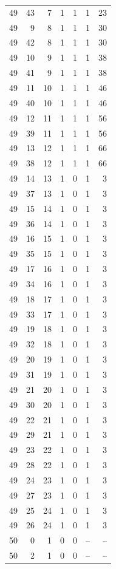 \begin{longtable}{rrrrrrr}
49 & 43 & 7 & 1 & 1 & 1 & 23\\
49 & 9 & 8 & 1 & 1 & 1 & 30\\
49 & 42 & 8 & 1 & 1 & 1 & 30\\
49 & 10 & 9 & 1 & 1 & 1 & 38\\
49 & 41 & 9 & 1 & 1 & 1 & 38\\
49 & 11 & 10 & 1 & 1 & 1 & 46\\
49 & 40 & 10 & 1 & 1 & 1 & 46\\
49 & 12 & 11 & 1 & 1 & 1 & 56\\
49 & 39 & 11 & 1 & 1 & 1 & 56\\
49 & 13 & 12 & 1 & 1 & 1 & 66\\
49 & 38 & 12 & 1 & 1 & 1 & 66\\
49 & 14 & 13 & 1 & 0 & 1 & 3\\
49 & 37 & 13 & 1 & 0 & 1 & 3\\
49 & 15 & 14 & 1 & 0 & 1 & 3\\
49 & 36 & 14 & 1 & 0 & 1 & 3\\
49 & 16 & 15 & 1 & 0 & 1 & 3\\
49 & 35 & 15 & 1 & 0 & 1 & 3\\
49 & 17 & 16 & 1 & 0 & 1 & 3\\
49 & 34 & 16 & 1 & 0 & 1 & 3\\
49 & 18 & 17 & 1 & 0 & 1 & 3\\
49 & 33 & 17 & 1 & 0 & 1 & 3\\
49 & 19 & 18 & 1 & 0 & 1 & 3\\
49 & 32 & 18 & 1 & 0 & 1 & 3\\
49 & 20 & 19 & 1 & 0 & 1 & 3\\
49 & 31 & 19 & 1 & 0 & 1 & 3\\
49 & 21 & 20 & 1 & 0 & 1 & 3\\
49 & 30 & 20 & 1 & 0 & 1 & 3\\
49 & 22 & 21 & 1 & 0 & 1 & 3\\
49 & 29 & 21 & 1 & 0 & 1 & 3\\
49 & 23 & 22 & 1 & 0 & 1 & 3\\
49 & 28 & 22 & 1 & 0 & 1 & 3\\
49 & 24 & 23 & 1 & 0 & 1 & 3\\
49 & 27 & 23 & 1 & 0 & 1 & 3\\
49 & 25 & 24 & 1 & 0 & 1 & 3\\
49 & 26 & 24 & 1 & 0 & 1 & 3\\
50 & 0 & 1 & 0 & 0 & -- & --\\
50 & 2 & 1 & 0 & 0 & -- & --\\

\end{longtable}
